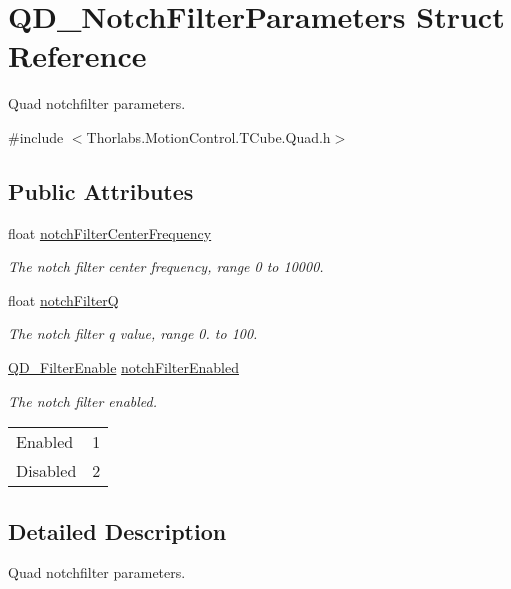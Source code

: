 \hypertarget{struct_q_d___notch_filter_parameters}{}\section{Q\+D\+\_\+\+Notch\+Filter\+Parameters Struct Reference}
\label{struct_q_d___notch_filter_parameters}


Quad notchfilter parameters.  




{\ttfamily \#include $<$Thorlabs.\+Motion\+Control.\+T\+Cube.\+Quad.\+h$>$}

\subsection*{Public Attributes}
\begin{DoxyCompactItemize}
\item 
float \hyperlink{struct_q_d___notch_filter_parameters_a0c9b3a2b354bbd78e5572e9b4a1ae8d7}{notch\+Filter\+Center\+Frequency}
\begin{DoxyCompactList}\small\item\em The notch filter center frequency, range 0 to 10000. \end{DoxyCompactList}\item 
float \hyperlink{struct_q_d___notch_filter_parameters_a75d88131cfcbc72f577a597cf9e4fcd7}{notch\+FilterQ}
\begin{DoxyCompactList}\small\item\em The notch filter q value, range 0. to 100. \end{DoxyCompactList}\item 
\hyperlink{group___t_cube_quad_gaf9cb69779549db4792c4e647b69eb29f}{Q\+D\+\_\+\+Filter\+Enable} \hyperlink{struct_q_d___notch_filter_parameters_adaa95114b057710c70f69e36d6b4534f}{notch\+Filter\+Enabled}
\begin{DoxyCompactList}\small\item\em The notch filter enabled. \tabulinesep=1mm
\begin{longtabu} spread 0pt [c]{*2{|X[-1]}|}
\hline
Enabled&1 \\
Disabled&2 \\
\end{longtabu}
\end{DoxyCompactList}\end{DoxyCompactItemize}


\subsection{Detailed Description}
Quad notchfilter parameters. 

